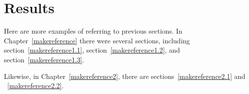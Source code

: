 
\cleardoublepage


\chapter{Results}
\label{makereference6}

Here are more examples of referring to previous sections.  In
Chapter~\ref{makereference} there were several sections, including
section~\ref{makereference1.1}, section~\ref{makereference1.2},
and section~\ref{makereference1.3}.

Likewise, in Chapter~\ref{makereference2}, there are
sections~\ref{makereference2.1} and ~\ref{makereference2.2}.

